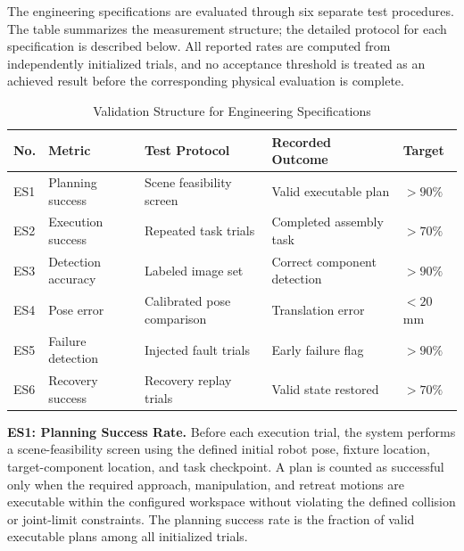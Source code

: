 \documentclass[12pt, letterpaper]{article}
\begin{document}
  The engineering specifications are evaluated through six separate test
  procedures. The table summarizes the measurement structure; the detailed
  protocol for each specification is described below. All reported rates are
  computed from independently initialized trials, and no acceptance threshold is
  treated as an achieved result before the corresponding physical evaluation is
  complete.

  \begin{table}[H]
  \centering
  \caption{Validation Structure for Engineering Specifications}
  \label{tab:analysis-vs-specifications}
  \small
  \setlength{\tabcolsep}{4pt}
  \begin{tabularx}{\textwidth}{
  >{\centering\arraybackslash}p{}
  p{}
  p{}
  p{}
  >{\centering\arraybackslash}p{}}
  \toprule
  \textbf{No.} &
  \textbf{Metric} &
  \textbf{Test Protocol} &
  \textbf{Recorded Outcome} &
  \textbf{Target} \\
  \midrule
  ES1 &
  Planning success &
  Scene feasibility screen &
  Valid executable plan &
  $>90\%$ \\

  ES2 &
  Execution success &
  Repeated task trials &
  Completed assembly task &
  $>70\%$ \\

  ES3 &
  Detection accuracy &
  Labeled image set &
  Correct component detection &
  $>90\%$ \\

  ES4 &
  Pose error &
  Calibrated pose comparison &
  Translation error &
  $<20$\,mm \\

  ES5 &
  Failure detection &
  Injected fault trials &
  Early failure flag &
  $>90\%$ \\

  ES6 &
  Recovery success &
  Recovery replay trials &
  Valid state restored &
  $>70\%$ \\
  \bottomrule
  \end{tabularx}
  \end{table}

  \noindent\textbf{ES1: Planning Success Rate.}
  Before each execution trial, the system performs a scene-feasibility screen
  using the defined initial robot pose, fixture location, target-component
  location, and task checkpoint. A plan is counted as successful only when the
  required approach, manipulation, and retreat motions are executable within the
  configured workspace without violating the defined collision or joint-limit
  constraints. The planning success rate is the fraction of valid executable
  plans among all initialized trials.
\end{document}
